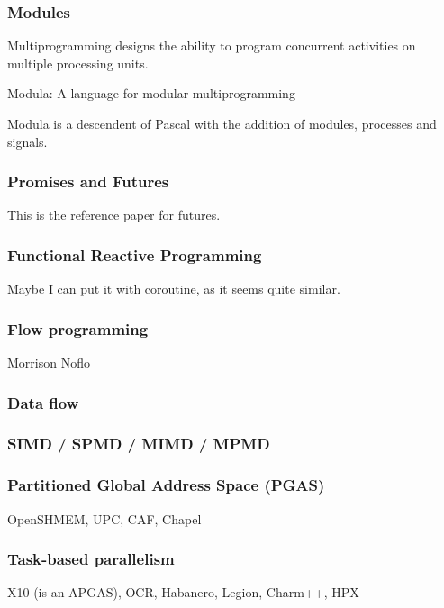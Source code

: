 \subsubsection{Modules}

Multiprogramming designs the ability to program concurrent activities on multiple processing units.

Modula: A language for modular multiprogramming \cite{Wirth1977}

Modula is a descendent of Pascal with the addition of modules, processes and signals.


\subsubsection{Promises and Futures}

This \cite{Jr1977} is the reference paper for futures.

\subsubsection{Functional Reactive Programming}

Maybe I can put it with coroutine, as it seems quite similar.

\subsubsection{Flow programming}
Morrison
Noflo

\subsubsection{Data flow}


\subsubsection{SIMD / SPMD / MIMD / MPMD}

\subsubsection{Partitioned Global Address Space (PGAS)}
OpenSHMEM, UPC, CAF, Chapel


\subsubsection{Task-based parallelism}
X10 (is an APGAS), OCR, Habanero, Legion, Charm++, HPX

